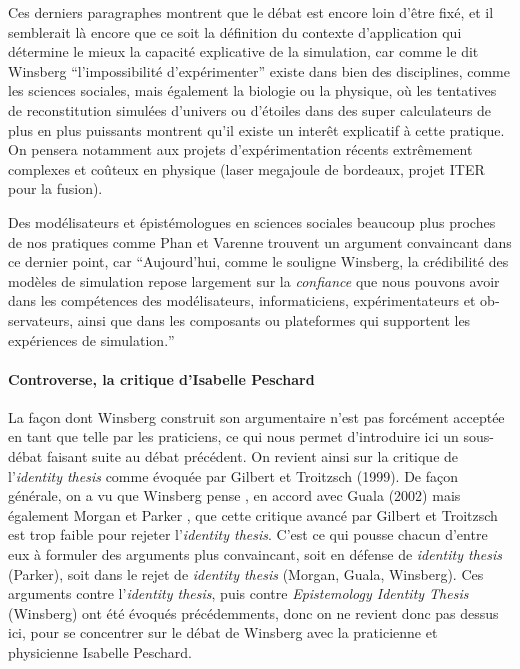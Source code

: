 Ces derniers paragraphes montrent que le débat est encore loin d'être fixé, et il semblerait là encore que ce soit la définition du contexte d'application qui détermine le mieux la capacité explicative de la simulation, car comme le dit Winsberg \enquote{l'impossibilité d'expérimenter} existe dans bien des disciplines, comme les sciences sociales, mais également la biologie ou la physique, où les tentatives de reconstitution simulées d'univers ou d'étoiles dans des super calculateurs de plus en plus puissants montrent qu'il existe un interêt explicatif à cette pratique. On pensera notamment aux projets d'expérimentation récents extrêmement complexes et coûteux en physique (laser megajoule de bordeaux, projet ITER pour la fusion).

Des modélisateurs et épistémologues en sciences sociales beaucoup plus proches de nos pratiques comme Phan et Varenne trouvent un argument convaincant dans ce dernier point, car \foreignquote{english}{Aujourd'hui, comme le souligne Winsberg, la crédibilité des modèles de simulation repose largement sur la \textit{confiance} que nous pouvons avoir dans les compétences des modélisateurs, informaticiens, expérimentateurs et observateurs, ainsi que dans les composants ou plateformes qui supportent les expériences de simulation.} \autocite{Phan2008}

\paragraph{Controverse, la critique d'Isabelle Peschard}

La façon dont Winsberg construit son argumentaire n'est pas forcément acceptée en tant que telle par les praticiens, ce qui nous permet d'introduire ici un sous-débat faisant suite au débat précédent. On revient ainsi sur la critique de l'\textit{identity thesis} comme évoquée par Gilbert et Troitzsch (1999). De façon générale, on a vu que Winsberg pense , en accord avec Guala (2002) \autocite{Winsberg2009} mais également Morgan  et Parker \autocite{Winsberg2013}, que cette critique avancé par Gilbert et Troitzsch est trop faible pour rejeter l'\textit{identity thesis}. C'est ce qui pousse chacun d'entre eux à formuler des arguments plus convaincant, soit en défense de \textit{identity thesis} (Parker), soit dans le rejet de \textit{identity thesis} (Morgan, Guala, Winsberg). Ces arguments contre l'\textit{identity thesis}, puis contre \textit{Epistemology Identity Thesis} (Winsberg) ont été évoqués précédemments, donc on ne revient donc pas dessus ici, pour se concentrer sur le débat de Winsberg avec la praticienne et physicienne Isabelle Peschard. 

